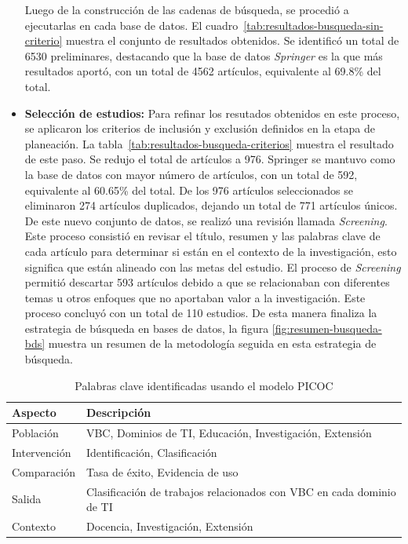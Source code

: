 \begin{itemize}
    Luego de la construcción de las cadenas de búsqueda, se procedió a ejecutarlas en cada base de datos. El cuadro~\ref{tab:resultados-busqueda-sin-criterio} muestra el conjunto de resultados obtenidos. Se identificó un total de 6530 preliminares, destacando que la base de datos \textit{Springer} es la que más resultados aportó, con un total de 4562 artículos, equivalente al 69.8\% del total.\\

    \item \textbf{Selección de estudios: } Para refinar los resutados obtenidos en este proceso, se aplicaron los criterios de inclusión y exclusión definidos en la etapa de planeación. La tabla~\ref{tab:resultados-busqueda-criterios} muestra el resultado de este paso. Se redujo el total de artículos a 976. Springer se mantuvo como la base de datos con mayor número de artículos, con un total de 592, equivalente al 60.65\% del total. De los 976 artículos seleccionados se eliminaron 274 artículos duplicados, dejando un total de 771 artículos únicos. De este nuevo conjunto de datos, se realizó una revisión llamada \textit{Screening}. Este proceso consistió en revisar el título, resumen y las palabras clave de cada artículo para determinar si están en el contexto de la investigación, esto significa que están alineado con las metas del estudio. 
    El proceso de \textit{Screening} permitió descartar 593 artículos debido a que se relacionaban con diferentes temas u otros enfoques que no aportaban valor a la investigación. Este proceso concluyó con un total de 110 estudios.
    De esta manera finaliza la estrategia de búsqueda en bases de datos, la figura \ref{fig:resumen-busqueda-bds} muestra un resumen de la metodología seguida en esta estrategia de búsqueda.\\
\end{itemize}

\begin{table}[tbp]
    \scriptsize %
    \centering
    \renewcommand{\arraystretch}{1.3}
    \begin{tabularx}{\columnwidth}{>{\centering\arraybackslash}m{} >{\RaggedRight\arraybackslash}X}
        \hline
        \textbf{Aspecto} & \textbf{Descripción} \\
        \hline
        Población & VBC, Dominios de TI, Educación, Investigación, Extensión \\
        Intervención & Identificación, Clasificación \\
        Comparación & Tasa de éxito, Evidencia de uso \\
        Salida & Clasificación de trabajos relacionados con VBC en cada dominio de TI \\
        Contexto & Docencia, Investigación, Extensión \\
        \hline
    \end{tabularx}
    \caption{Palabras clave identificadas usando el modelo PICOC}\label{tab:palabras-clave}
\end{table}

